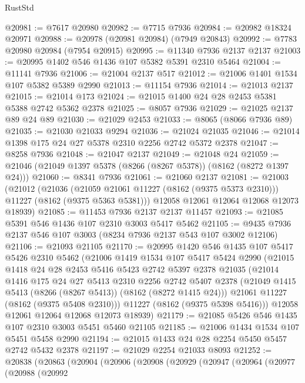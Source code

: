 \begin{lexlean}{RustStd}
\begin{coremodule}
@20981 := @7617 @20980
@20982 := @7715 @7936
@20984 := @20982 @18324 @20971
@20988 := @20978 (@20981 @20984) (@7949 @20843)
@20992 := @7783 @20980 @20984 (@7954 @20915)
@20995 := @11340 @7936 @2137 @2137
@21003 := @20995 @1402 @546 @1436 @107 @5382 @5391 @2310 @5464
@21004 := @11141 @7936
@21006 := @21004 @2137 @517
@21012 := @21006 @1401 @1534 @107 @5382 @5389 @2990
@21013 := @11154 @7936
@21014 := @21013 @2137
@21015 := @21014 @173
@21024 := @21015 @1400 @24 @28 @2453 @5381 @5388 @2742 @5362 @2378
@21025 := @8057 @7936
@21029 := @21025 @2137 @89 @24 @89
@21030 := @21029 @2453
@21033 := @8065 (@8066 @7936 @89)
@21035 := @21030 @21033 @9294
@21036 := @21024 @21035
@21046 := @21014 @1398 @175 @24 @27 @5378 @2310 @2256 @2742 @5372 @2378
@21047 := @8258 @7936
@21048 := @21047 @2137
@21049 := @21048 @24
@21059 := @21046 (@21049 @1397 @5378 (@8266 (@8267 @5378)) (@8162 (@8272 @1397 @24)))
@21060 := @8341 @7936
@21061 := @21060 @2137
@21081 := @21003
    (@21012
      (@21036 (@21059 @21061 @11227 (@8162 (@9375 @5373 @2310))) @11227 (@8162 (@9375 @5363 @5381)))
      @12058
      @12061
      @12064
      @12068
      @12073
      @18939)
@21085 := @11453 @7936 @2137 @2137 @11457
@21093 := @21085 @5391 @546 @1436 @107 @2310 @3003 @5417 @5462
@21105 := @9435 @7936 @2137 @546 @107 @3003 (@8234 @7936 @2137 @543 @107 @3002 @12106)
@21106 := @21093 @21105
@21170 := @20995
    @1420
    @546
    @1435
    @107
    @5417
    @5426
    @2310
    @5462
    (@21006
      @1419
      @1534
      @107
      @5417
      @5424
      @2990
      (@21015
        @1418
        @24
        @28
        @2453
        @5416
        @5423
        @2742
        @5397
        @2378
        @21035
        (@21014
          @1416
          @175
          @24
          @27
          @5413
          @2310
          @2256
          @2742
          @5407
          @2378
          (@21049 @1415 @5413 (@8266 (@8267 @5413)) (@8162 (@8272 @1415 @24)))
          @21061
          @11227
          (@8162 (@9375 @5408 @2310)))
        @11227
        (@8162 (@9375 @5398 @5416)))
      @12058
      @12061
      @12064
      @12068
      @12073
      @18939)
@21179 := @21085 @5426 @546 @1435 @107 @2310 @3003 @5451 @5460 @21105
@21185 := @21006 @1434 @1534 @107 @5451 @5458 @2990
@21194 := @21015 @1433 @24 @28 @2254 @5450 @5457 @2742 @5432 @2378
@21197 := @21029 @2254 @21033 @8093
@21252 := @20838
    (@20863
      (@20904
        (@20906
          (@20908
            (@20929
              (@20947
                (@20964
                  (@20977
                    (@20988
                      (@20992

\end{coremodule}
\end{lexlean}
